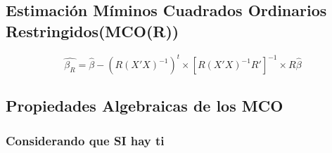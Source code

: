 \documentclass[a4paper,12pt]{article}
\begin{document}
\subsection{Estimación Míminos Cuadrados Ordinarios Restringidos(MCO(R))}

\begin{equation}
    \widehat{\beta_R} = \widehat{\beta} - (R(X'X)^{-1})^t \times [R(X'X)^{-1}R']^{-1} \times R\widehat{\beta}
\end{equation}

\subsection{Propiedades Algebraicas de los MCO}

\subsubsection*{Considerando que SI hay ti}
\end{document}
